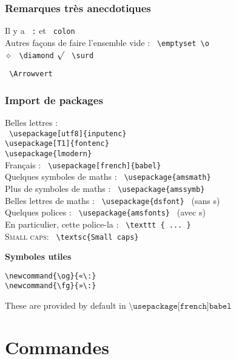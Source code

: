 \documentclass{report}
\begin{document}
\subsubsection*{Remarques très anecdotiques}

Il y a  \texttt{ :} et \texttt{ colon} \\
Autres façons de faire l'ensemble vide : \texttt{ \textbackslash{}emptyset \textbackslash{}o } \\
$ \diamond $ \quad \texttt{ \textbackslash{}diamond} $ \surd $   \texttt{ \textbackslash{}surd}

\texttt{ \textbackslash{}Arrowvert}


\subsubsection*{Import de packages}

Belles lettres : \\
\texttt{
\textbackslash{}usepackage[utf8]\{inputenc\} \\
\textbackslash{}usepackage[T1]\{fontenc\} \\
\textbackslash{}usepackage\{lmodern\}
} \\
Français : \texttt{ \textbackslash{}usepackage[french]\{babel\} } \\
Quelques symboles de maths : \texttt{ \textbackslash{}usepackage\{amsmath\} } \\
Plus de symboles de maths : \texttt{ \textbackslash{}usepackage\{amssymb\} } \\
Belles lettres de maths : \texttt{ \textbackslash{}usepackage\{dsfont\} } (sans s) \\
Quelques polices : \texttt{ \textbackslash{}usepackage\{amsfonts\} } (avec s)\\
En particulier, cette police-la : \texttt{ \textbackslash texttt \{ ... \}}\\
\textsc{Small caps: } \texttt{ \textbackslash textsc\{Small caps\} }

\textbf{Symboles utiles}

\begin{verbatim}
\newcommand{\og}{«\:}
\newcommand{\fg}{»\:}
\end{verbatim}

These are provided by default in $\texttt{\textbackslash usepackage[french]{babel}}$

\newpage

\section*{Commandes}
\end{document}

